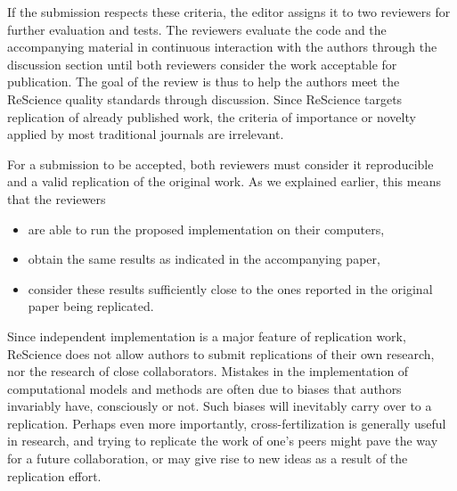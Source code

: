 \documentclass[a4paper,10pt, twocolumn]{article}
\begin{document}
If the submission respects these criteria, the editor assigns it to
two reviewers for further evaluation and tests. The reviewers evaluate
the code and the accompanying material in continuous interaction with
the authors through the discussion section until both reviewers
consider the work acceptable for publication. The goal of the review
is thus to help the authors meet the ReScience quality standards
through discussion. Since ReScience targets replication of already
published work, the criteria of importance or novelty applied by most
traditional journals are irrelevant.

For a submission to be accepted, both reviewers must consider it
reproducible and a valid replication of the original work. As we
explained earlier, this means that the reviewers
\begin{itemize}
\item are able to run the proposed implementation on their computers,
\item obtain the same results as indicated in the accompanying paper,
\item consider these results sufficiently close to the ones reported in the original paper being replicated.
\end{itemize}
%

Since independent implementation is a major feature of replication
work, ReScience does not allow authors to submit replications of their
own research, nor the research of close collaborators. Mistakes in the
implementation of computational models and methods are often due to
biases that authors invariably have, consciously or not. Such biases
will inevitably carry over to a replication. Perhaps even more
importantly, cross-fertilization is generally useful in research, and
trying to replicate the work of one’s peers might pave the way for a
future collaboration, or may give rise to new ideas as a result of the
replication effort.



\end{document}

